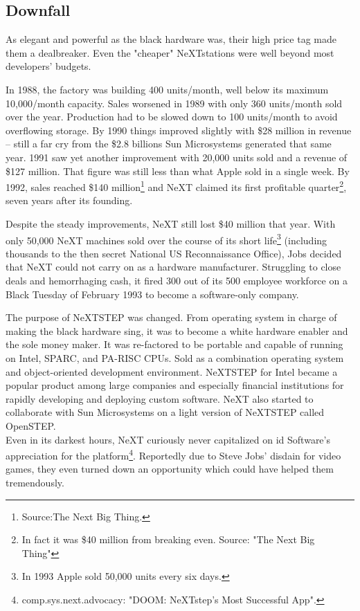\subsection{Downfall}
As elegant and powerful as the black hardware was, their high price tag made them a dealbreaker. Even the "cheaper" NeXTstations were well beyond most developers' budgets.\\
\par
 In 1988, the factory was building 400 units/month, well below its maximum 10,000/month capacity. Sales worsened in 1989 with only 360 units/month sold over the year. Production had to be slowed down to 100 units/month to avoid overflowing storage. By 1990 things improved slightly with \$28 million in revenue -- still a far cry from the \$2.8 billions Sun Microsystems generated that same year. 1991 saw yet another improvement with 20,000 units sold and a revenue of \$127 million. That figure was still less than what Apple sold in a single week. By 1992, sales reached \$140 million\footnote{Source:The Next Big Thing.} and NeXT claimed its first profitable quarter\footnote{In fact it was \$40 million from breaking even. Source: "The Next Big Thing"}, seven years after its founding.\\
\par
Despite the steady improvements, NeXT still lost \$40 million that year. With only 50,000 NeXT machines sold over the course of its short life\footnote{In 1993 Apple sold 50,000 units every six days.} (including thousands to the then secret National US Reconnaissance Office), Jobs decided that NeXT could not carry on as a hardware manufacturer. Struggling to close deals and hemorrhaging cash, it fired 300 out of its 500 employee workforce on a Black Tuesday of February 1993 to become a software-only company.\\
\par
 The purpose of NeXTSTEP was changed. From operating system in charge of making the black hardware sing, it was to become a white hardware enabler and the sole money maker. It was re-factored to be portable and capable of running on Intel, SPARC, and PA-RISC CPUs. Sold as a combination operating system and object-oriented development environment. NeXTSTEP for Intel became a popular product among large companies and especially financial institutions for rapidly developing and deploying custom software. NeXT also started to collaborate with Sun Microsystems on a light version of NeXTSTEP called OpenSTEP.\\
Even in its darkest hours, NeXT curiously never capitalized on id Software's appreciation for the platform\footnote{comp.sys.next.advocacy: "DOOM: NeXTstep's Most Successful App".}. Reportedly due to Steve Jobs' disdain for video games, they even turned down an opportunity which could have helped them tremendously.\\
\par

